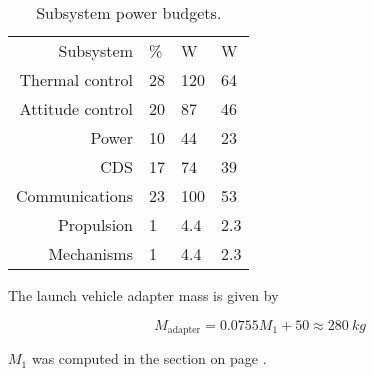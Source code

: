 \begin{table}[H]
  \label{tbl:powerbudget}
  \caption{Subsystem power budgets.}
  \begin{center}
    \begin{tabular}{rlll}
      Subsystem & \si{\%} & \si{W} & \si{W} \\
      Thermal control & 28 & 120 & 64 \\
      Attitude control & 20 & 87 & 46 \\
      Power & 10 & 44 & 23 \\
      CDS & 17 & 74 & 39 \\
      Communications & 23 & 100 & 53 \\
      Propulsion & 1 & 4.4 & 2.3 \\
      Mechanisms & 1 & 4.4 & 2.3
    \end{tabular}
  \end{center}
\end{table}

The launch vehicle adapter mass is given by

\begin{equation}
  M_{\mathrm{adapter}} = 0.0755 M_{1} + 50 \approx \SI{280}{kg}
\end{equation}

$M_1$ was computed in the section on page \pageref{sec:initialmass}.

